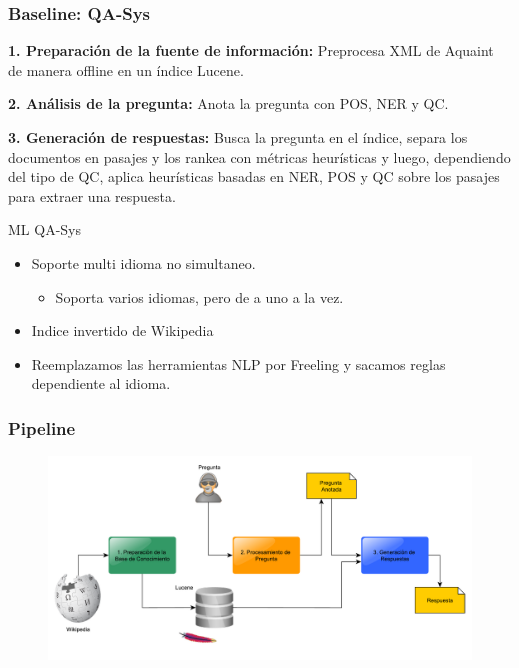\begin{frame}
\frametitle{Baseline: QA-Sys}
  \textbf{1. Preparación de la fuente de información: } Preprocesa XML de Aquaint de manera offline en un índice Lucene. \newline

\textbf{2. Análisis de la pregunta: } \newline Anota la pregunta con POS, NER y QC. \newline

\textbf{3. Generación de respuestas: } Busca la pregunta en el índice, separa los documentos en pasajes y los rankea con métricas heurísticas y luego, dependiendo del tipo de QC, aplica heurísticas basadas en NER, POS y QC sobre los pasajes para extraer una respuesta.\newline

\medskip

\begin{exampleblock}{ML QA-Sys}
  \begin{itemize}
    \item Soporte multi idioma no simultaneo.
    \begin{itemize}
      \item Soporta varios idiomas, pero de a uno a la vez.
    \end{itemize}
    \item Indice invertido de Wikipedia
    \item Reemplazamos las herramientas NLP por Freeling y sacamos reglas dependiente al idioma.
  \end{itemize}
\end{exampleblock}

\end{frame}


\begin{frame}
\frametitle{Pipeline}
  \begin{figure}
      \includegraphics[scale=0.3]{graficos/pipeline}
  \end{figure}
\end{frame}


